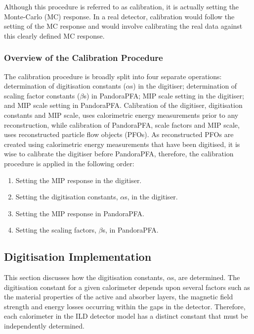 Although this procedure is referred to as calibration, it is actually setting the Monte-Carlo (MC) response.  In a real detector, calibration would follow the setting of the MC response and would involve calibrating the real data against this clearly defined MC response.  


\subsubsection{Overview of the Calibration Procedure}
\label{sec:ordercalibration}
The calibration procedure is broadly split into four separate operations: determination of digitisation constants ($\alpha$s) in the digitiser; determination of scaling factor constants ($\beta$s) in PandoraPFA; MIP scale setting in the digitiser; and MIP scale setting in PandoraPFA.  Calibration of the digitiser, digitisation constants and MIP scale, uses calorimetric energy measurements prior to any reconstruction, while calibration of PandoraPFA, scale factors and MIP scale, uses reconstructed particle flow objects (PFOs).  As reconstructed PFOs are created using calorimetric energy measurements that have been digitised, it is wise to calibrate the digitiser before PandoraPFA, therefore, the calibration procedure is applied in the following order:
\begin{enumerate} 
\item Setting the MIP response in the digitiser.  
\item Setting the digitisation constants, $\alpha$s, in the digitiser.  
\item Setting the MIP response in PandoraPFA.  
\item Setting the scaling factors, $\beta$s, in PandoraPFA.  
\end{enumerate} 


\subsection{Digitisation Implementation}
\label{sec:digi}
This section discusses how the digitisation constants, $\alpha$s, are determined.  The digitisation constant for a given calorimeter depends upon several factors such as the material properties of the active and absorber layers, the magnetic field strength and energy losses occurring within the gaps in the detector.  Therefore, each calorimeter in the ILD detector model has a distinct constant that must be independently determined. 

